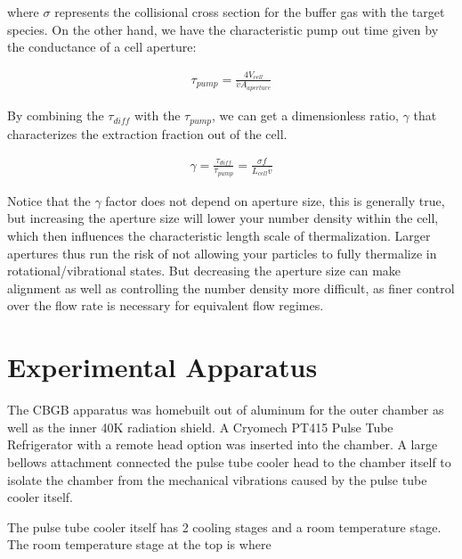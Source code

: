 \documentclass[a4paper]{article}
\begin{document}
where $\sigma$ represents the collisional cross section for the buffer gas with the target species. On the other hand, we have the characteristic pump out time given by the conductance of a cell aperture:

\begin{align}
\tau_{pump}=\frac{4V_{cell}}{\bar{v}A_{aperture}}
\end{align}

By combining the $\tau_{diff}$ with the $\tau_{pump}$, we can get a dimensionless ratio, $\gamma$ that characterizes the extraction fraction out of the cell.

\begin{align}
\gamma = \frac{\tau_{diff}}{\tau_{pump}} = \frac{\sigma f}{L_{cell} \bar{v}} \label{e: gamma}
\end{align}

Notice that the $\gamma$ factor does not depend on aperture size, this is generally true, but increasing the aperture size will lower your number density within the cell, which then influences the characteristic length scale of thermalization. Larger apertures thus run the risk of not allowing your particles to fully thermalize in rotational/vibrational states. But decreasing the aperture size can make alignment as well as controlling the number density more difficult, as finer control over the flow rate is necessary for equivalent flow regimes.

\section{Experimental Apparatus}

The CBGB apparatus was homebuilt out of aluminum for the outer chamber as well as the inner 40K radiation shield. A Cryomech PT415 Pulse Tube Refrigerator with a remote head option was inserted into the chamber. A large bellows attachment connected the pulse tube cooler head to the chamber itself to isolate the chamber from the mechanical vibrations caused by the pulse tube cooler itself.

The pulse tube cooler itself has 2 cooling stages and a room temperature stage. The room temperature stage at the top is where 
\end{document}
